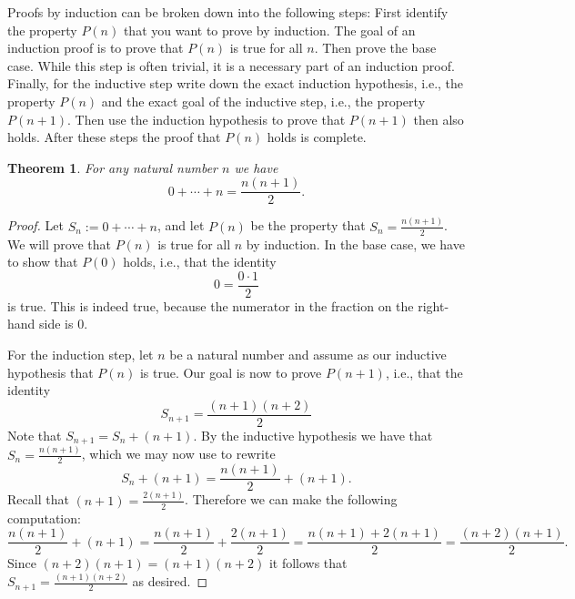 \documentclass{article}
\newtheorem{theorem}{Theorem}[section]
\theoremstyle{definition}
\theoremstyle{remark}
\begin{document}
Proofs by induction can be broken down into the following steps: First identify the property $P(n)$ that you want to prove by induction. The goal of an induction proof is to prove that $P(n)$ is true for all $n$. Then prove the base case. While this step is often trivial, it is a necessary part of an induction proof. Finally, for the inductive step write down the exact induction hypothesis, i.e., the property $P(n)$ and the exact goal of the inductive step, i.e., the property $P(n+1)$. Then use the induction hypothesis to prove that $P(n+1)$ then also holds. After these steps the proof that $P(n)$ holds is complete.

\begin{theorem}
  For any natural number $n$ we have
  \begin{equation*}
    0 + \cdots + n = \frac{n(n+1)}{2}.
  \end{equation*}
\end{theorem}

\begin{proof}
  Let $S_n:=0+\cdots+n$, and let $P(n)$ be the property that $S_n=\frac{n(n+1)}{2}$. We will prove that $P(n)$ is true for all $n$ by induction. In the base case, we have to show that $P(0)$ holds, i.e., that the identity
  \begin{equation*}
    0=\frac{0\cdot 1}{2}
  \end{equation*}
  is true. This is indeed true, because the numerator in the fraction on the right-hand side is $0$.

  For the induction step, let $n$ be a natural number and assume as our inductive hypothesis that $P(n)$ is true. Our goal is now to prove $P(n+1)$, i.e., that the identity
  \begin{equation*}
    S_{n+1}=\frac{(n+1)(n+2)}{2}
  \end{equation*}
  Note that $S_{n+1}=S_n+(n+1)$. By the inductive hypothesis we have that $S_n=\frac{n(n+1)}{2}$, which we may now use to rewrite
  \begin{equation*}
    S_n + (n+1) = \frac{n(n+1)}{2} + (n+1).
  \end{equation*}
  Recall that $(n+1)=\frac{2(n+1)}{2}$. Therefore we can make the following computation:
  \begin{equation*}
    \frac{n(n+1)}{2} + (n+1) = \frac{n(n+1)}{2}+\frac{2(n+1)}{2} = \frac{n(n+1)+2(n+1)}{2}=\frac{(n+2)(n+1)}{2}.
  \end{equation*}
  Since $(n+2)(n+1)=(n+1)(n+2)$ it follows that $S_{n+1}=\frac{(n+1)(n+2)}{2}$ as desired.
\end{proof}
\end{document}
